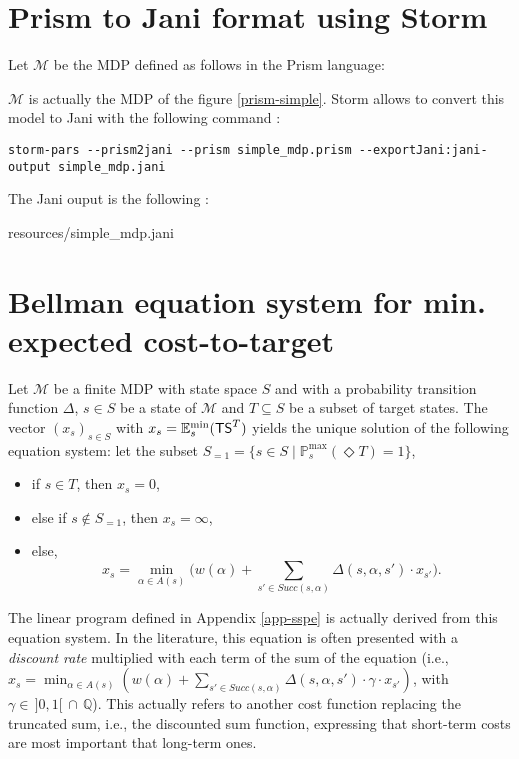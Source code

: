 \section{Prism to Jani format using Storm}\label{prism2jani}
Let $\mathcal{M}$ be the MDP defined as follows in the Prism language:

$\mathcal{M}$ is actually the MDP of the figure \ref{prism-simple}.
Storm allows to convert this model to Jani with the following command :
{\scriptsize
\begin{verbatim}
storm-pars --prism2jani --prism simple_mdp.prism --exportJani:jani-output simple_mdp.jani
\end{verbatim}
}
The Jani ouput is the following :

    {resources/simple_mdp.jani}

\section{Bellman equation system for min. expected cost-to-target} \label{bellman2}
  Let $\mathcal{M}$ be a finite MDP with state space $S$ and with a probability transition function $\Delta$, $s \in S$ be a state of $\mathcal{M}$ and $T \subseteq S$ be a subset of target states. The vector $(x_s)_{s \in S}$ with $x_s = \mathbb{E}_s^{\min}(\text{\sffamily TS}^T)$ yields the unique solution of the following equation system: let the subset $S_{=1} = \{s \in S \; | \; \mathbb{P}^{\max}_s(\Diamond T) = 1 \}$,
  \begin{itemize}
    \item if $s \in T$, then $x_s=0$,
    \item else if $s \not \in S_{=1}$, then $x_s=\infty$,
    \item else,
    \[ x_s = \min_{\alpha \in A(s)} \big( w(\alpha) + \sum_{s' \in Succ(s, \alpha)} \Delta(s, \alpha, s') \cdot x_{s'} \big). \]
  \end{itemize}
The linear program defined in Appendix \ref{app-sspe} is actually derived from this equation system.
In the literature, this equation is often presented with a \textit{discount rate} multiplied with each term of the sum of the equation
(i.e., $x_s = \min_{\alpha \in A(s)} ( w(\alpha) + \sum_{s' \in Succ(s, \alpha)} \Delta(s, \alpha, s') \cdot \gamma \cdot x_{s'} )$, with $\gamma \in \,]0, 1[ \, \cap \,\mathbb{Q}$).
This actually refers to another cost function replacing the truncated sum, i.e., the discounted sum function, expressing that short-term costs are most important that long-term ones.
